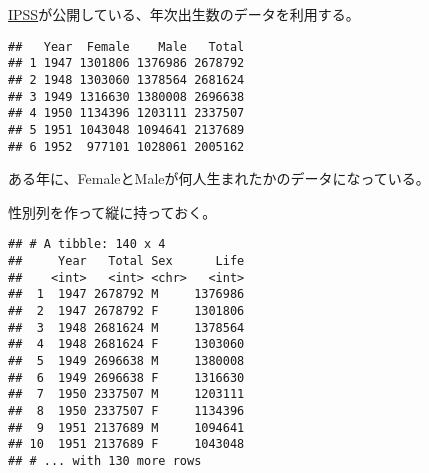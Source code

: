 \documentclass[
]{book}
\newenvironment{Shaded}{\begin{snugshade}}{\end{snugshade}}
\newcommand{\DataTypeTok}[1]{\textcolor[rgb]{0.13,0.29,0.53}{#1}}
\newcommand{\DecValTok}[1]{\textcolor[rgb]{0.00,0.00,0.81}{#1}}
\newcommand{\KeywordTok}[1]{\textcolor[rgb]{0.13,0.29,0.53}{\textbf{#1}}}
\newcommand{\NormalTok}[1]{#1}
\newcommand{\OperatorTok}[1]{\textcolor[rgb]{0.81,0.36,0.00}{\textbf{#1}}}
\newcommand{\OtherTok}[1]{\textcolor[rgb]{0.56,0.35,0.01}{#1}}
\newcommand{\StringTok}[1]{\textcolor[rgb]{0.31,0.60,0.02}{#1}}
\begin{document}
\href{http://www.ipss.go.jp/}{IPSS}が公開している、年次出生数のデータを利用する。

\begin{Shaded}
\end{Shaded}

\begin{verbatim}
##   Year  Female    Male   Total
## 1 1947 1301806 1376986 2678792
## 2 1948 1303060 1378564 2681624
## 3 1949 1316630 1380008 2696638
## 4 1950 1134396 1203111 2337507
## 5 1951 1043048 1094641 2137689
## 6 1952  977101 1028061 2005162
\end{verbatim}

ある年に、FemaleとMaleが何人生まれたかのデータになっている。

性別列を作って縦に持っておく。

\begin{Shaded}
\end{Shaded}

\begin{verbatim}
## # A tibble: 140 x 4
##     Year   Total Sex      Life
##    <int>   <int> <chr>   <int>
##  1  1947 2678792 M     1376986
##  2  1947 2678792 F     1301806
##  3  1948 2681624 M     1378564
##  4  1948 2681624 F     1303060
##  5  1949 2696638 M     1380008
##  6  1949 2696638 F     1316630
##  7  1950 2337507 M     1203111
##  8  1950 2337507 F     1134396
##  9  1951 2137689 M     1094641
## 10  1951 2137689 F     1043048
## # ... with 130 more rows
\end{verbatim}
\end{document}
